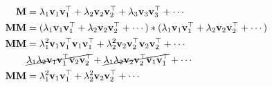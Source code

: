\documentclass{article}
\newcommand{\bM}{\mathbf{M}}
\newcommand{\bv}{\mathbf{v}}
\begin{document}
	\begin{equation}
	\begin{aligned}
	\bM &= \lambda_{1}\bv_{1}\bv_{1}^{\top} + \lambda_{2}\bv_{2}\bv_{2}^{\top} + \lambda_{3}\bv_{3}\bv_{3}^{\top} + \cdots\\
	\bM\bM &=  (\lambda_{1}\bv_{1}\bv_{1}^{\top} + \lambda_{2}\bv_{2}\bv_{2}^{\top} + \cdots) *  (\lambda_{1}\bv_{1}\bv_{1}^{\top} + \lambda_{2}\bv_{2}\bv_{2}^{\top} + \cdots)\\
	\bM\bM &= \lambda_{1}^{2}\bv_{1}\bv_{1}^{\top}\bv_{1}\bv_{1}^{\top} +  \lambda_{2}^{2}\bv_{2}\bv_{2}^{\top}\bv_{2}\bv_{2}^{\top} + \cdots\\
	 &\cancel{\lambda_{1}\lambda_{2}\bv_{1}\bv_{1}^{\top}\bv_{2}\bv_{2}^{\top}} + \cancel{\lambda_{1}\lambda_{2}\bv_{2}\bv_{2}^{\top}\bv_{1}\bv_{1}^{\top}} + \cdots\\
	\bM\bM &= \lambda_{1}^{2}\bv_{1}\bv_{1}^{\top} +  \lambda_{2}^{2}\bv_{2}\bv_{2}^{\top} + \cdots\\
	\end{aligned}
	\end{equation}
	
\end{document}
